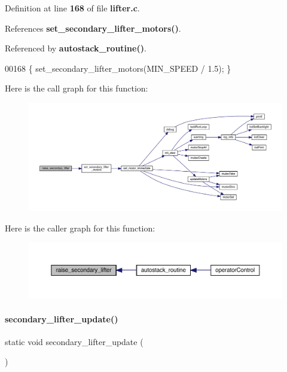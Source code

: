 Definition at line \textbf{ 168} of file \textbf{ lifter.\+c}.



References \textbf{ set\+\_\+secondary\+\_\+lifter\+\_\+motors()}.



Referenced by \textbf{ autostack\+\_\+routine()}.


\begin{DoxyCode}
00168 \{ set_secondary_lifter_motors(MIN\_SPEED / 1.5); \}
\end{DoxyCode}
Here is the call graph for this function\+:
\nopagebreak
\begin{figure}[H]
\begin{center}
\leavevmode
\includegraphics[width=350pt]{lifter_8c_a786f679ea48bb8c80e00fbac9a69911b_cgraph}
\end{center}
\end{figure}
Here is the caller graph for this function\+:
\nopagebreak
\begin{figure}[H]
\begin{center}
\leavevmode
\includegraphics[width=350pt]{lifter_8c_a786f679ea48bb8c80e00fbac9a69911b_icgraph}
\end{center}
\end{figure}
\mbox{\label{lifter_8c_ac59fe6ffc80bab7f117ec0a8e482277b}} 
\paragraph{secondary\+\_\+lifter\+\_\+update()}
{\footnotesize\ttfamily static void secondary\+\_\+lifter\+\_\+update (\begin{DoxyParamCaption}{ }\end{DoxyParamCaption})\hspace{0.3cm}{\ttfamily [static]}}



